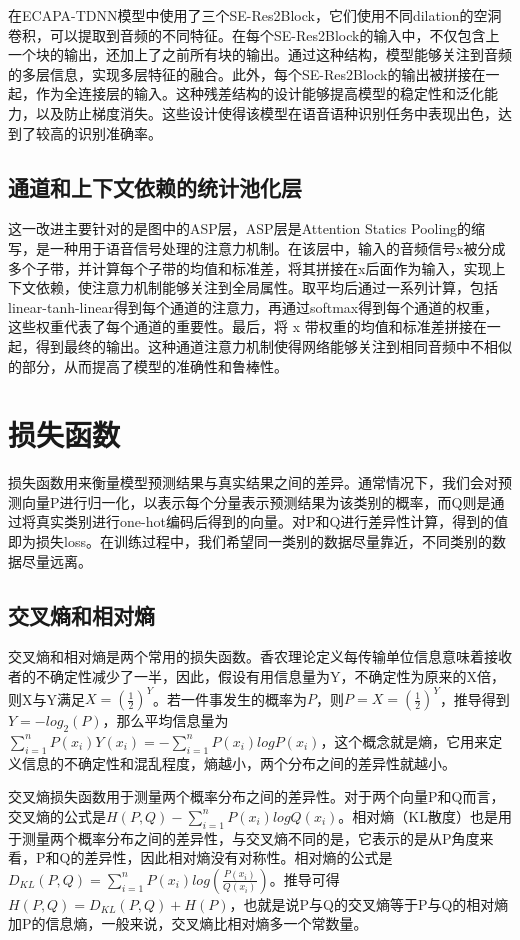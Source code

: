 在ECAPA-TDNN模型中使用了三个SE-Res2Block，它们使用不同dilation的空洞卷积，可以提取到音频的不同特征。在每个SE-Res2Block的输入中，不仅包含上一个块的输出，还加上了之前所有块的输出。通过这种结构，模型能够关注到音频的多层信息，实现多层特征的融合。此外，每个SE-Res2Block的输出被拼接在一起，作为全连接层的输入。这种残差结构的设计能够提高模型的稳定性和泛化能力，以及防止梯度消失。这些设计使得该模型在语音语种识别任务中表现出色，达到了较高的识别准确率。

\section{通道和上下文依赖的统计池化层}
这一改进主要针对的是图中的ASP层，ASP层是Attention Statics Pooling\cite{okabe_attentive_2018}的缩写，是一种用于语音信号处理的注意力机制。在该层中，输入的音频信号x被分成多个子带，并计算每个子带的均值和标准差，将其拼接在x后面作为输入，实现上下文依赖，使注意力机制能够关注到全局属性。取平均后通过一系列计算，包括linear-tanh-linear得到每个通道的注意力，再通过softmax得到每个通道的权重，这些权重代表了每个通道的重要性。最后，将 x 带权重的均值和标准差拼接在一起，得到最终的输出。这种通道注意力机制使得网络能够关注到相同音频中不相似的部分，从而提高了模型的准确性和鲁棒性。



\chapter{损失函数}
损失函数用来衡量模型预测结果与真实结果之间的差异。通常情况下，我们会对预测向量P进行归一化，以表示每个分量表示预测结果为该类别的概率，而Q则是通过将真实类别进行one-hot编码后得到的向量。对P和Q进行差异性计算，得到的值即为损失loss。在训练过程中，我们希望同一类别的数据尽量靠近，不同类别的数据尽量远离。

\section{交叉熵和相对熵}
交叉熵和相对熵是两个常用的损失函数。香农理论定义每传输单位信息意味着接收者的不确定性减少了一半，因此，假设有用信息量为Y，不确定性为原来的X倍，则X与Y满足$X=(\frac{1}{2})^Y$。若一件事发生的概率为$P$，则$P=X=(\frac{1}{2})^Y$，推导得到$Y=-log_2(P)$，那么平均信息量为$\sum_{i=1}^{n} P(x_i)Y(x_i)=-\sum_{i=1}^{n}P(x_i)logP(x_i)$，这个概念就是熵，它用来定义信息的不确定性和混乱程度，熵越小，两个分布之间的差异性就越小。

交叉熵损失函数用于测量两个概率分布之间的差异性。对于两个向量P和Q而言，交叉熵的公式是$H(P,Q)-\sum_{i=1}^{n}P(x_i)logQ(x_i)$。相对熵（KL散度）也是用于测量两个概率分布之间的差异性，与交叉熵不同的是，它表示的是从P角度来看，P和Q的差异性，因此相对熵没有对称性。相对熵的公式是$D_{KL}(P,Q)=\sum_{i=1}^{n}P(x_i)log(\frac{P(x_i)}{Q(x_i)})$。推导可得$H(P,Q)=D_{KL}(P,Q)+H(P)$，也就是说P与Q的交叉熵等于P与Q的相对熵加P的信息熵，一般来说，交叉熵比相对熵多一个常数量。

